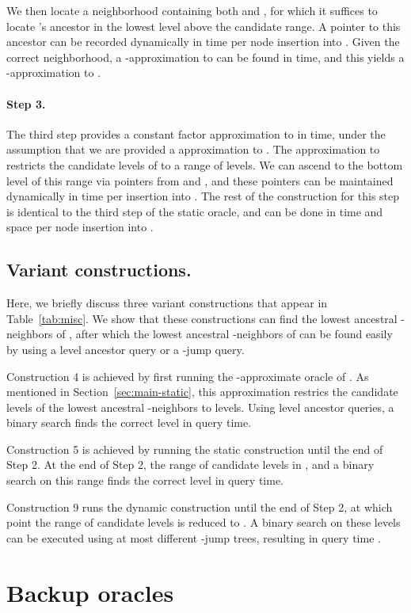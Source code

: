 \documentclass[11pt]{article}
\begin{document}
We then locate a neighborhood containing both  and , for which it suffices to
locate 's ancestor in the lowest level  above the candidate range.
A pointer to this ancestor can be recorded dynamically in time  per node
insertion into . Given the correct neighborhood, a -approximation to
 can be found in  time, and this yields a -approximation
to .

\paragraph{Step 3.}
The third step provides a constant factor approximation to  in  time,
under the assumption that we are provided a  approximation to .
The  approximation to  restricts the candidate
levels of  to a range of  levels. We can ascend to the bottom
level of this range via pointers from  and , and these pointers can be maintained
dynamically in  time per insertion into .
The rest of the construction for this step is identical to the third step of the static
oracle, and can be done in  time and space per node insertion
into .

\subsection{Variant constructions.}\label{sec:misc}
Here, we briefly discuss three variant constructions that appear in 
Table~\ref{tab:misc}. We show that these constructions can find the lowest ancestral 
-neighbors of , after which the lowest ancestral -neighbors of  can be 
found easily by using a level ancestor query or a -jump query.

Construction 4 is achieved by first running the -approximate 
oracle of \cite{MeSc09}. As mentioned in Section~\ref{sec:main-static}, this 
approximation restrics the candidate levels of the lowest ancestral -neighbors to 
 levels. Using level ancestor queries, a binary search finds the correct 
level in  query time.

Construction 5 is achieved by running the static construction until the end of Step 2.
At the end of Step 2, the range of candidate levels in , and a binary 
search on this range finds the correct level in  query time.

Construction 9 runs the dynamic construction until the end of Step 2, at which
point the range of candidate levels is reduced to 
. 
A binary search on these levels can be executed using at most  
different -jump trees, resulting in query time
.

\section{Backup oracles}\label{sec:backup}
\end{document}
